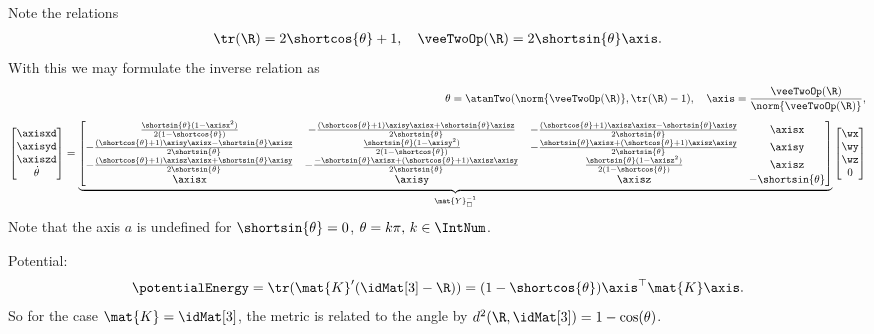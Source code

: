 Note the relations
\begin{align}
 \tr(\R) = 2\shortcos{\theta} + 1, \quad \veeTwoOp(\R) = 2 \shortsin{\theta} \axis.
\end{align}
With this we may formulate the inverse relation as
\begin{align}
 \theta = \atanTwo(\norm{\veeTwoOp(\R)}, \tr(\R)-1),
 \quad
 \axis = \frac{\veeTwoOp(\R)}{\norm{\veeTwoOp(\R)}},
\\[1ex]
 \begin{bmatrix} \axisxd \\ \axisyd \\ \axiszd \\ \dot{\theta} \end{bmatrix}
 =
 \underbrace{\begin{bmatrix}
  \tfrac{\shortsin{\theta} (1-\axisx^2)}{2(1-\shortcos{\theta})} & -\tfrac{(\shortcos{\theta}+1) \axisy \axisx + \shortsin{\theta} \axisz}{2\shortsin{\theta}} & -\tfrac{(\shortcos{\theta}+1) \axisz \axisx-\shortsin{\theta} \axisy}{2\shortsin{\theta}} & \axisx \\
  -\tfrac{(\shortcos{\theta}+1) \axisy \axisx-\shortsin{\theta} \axisz}{2\shortsin{\theta}} & \tfrac{\shortsin{\theta}(1-\axisy^2)}{2(1-\shortcos{\theta})} & -\tfrac{\shortsin{\theta} \axisx+(\shortcos{\theta}+1) \axisz \axisy}{2\shortsin{\theta}} & \axisy \\
  -\tfrac{(\shortcos{\theta}+1) \axisz \axisx+\shortsin{\theta} \axisy}{2\shortsin{\theta}} & -\tfrac{-\shortsin{\theta} \axisx+(\shortcos{\theta}+1) \axisz \axisy}{2\shortsin{\theta}} & \tfrac{\shortsin{\theta}(1-\axisz^2)}{2(1-\shortcos{\theta})} & \axisz \\
  \axisx & \axisy & \axisz & -\shortsin{\theta}
 \end{bmatrix}}_{\mat{Y}_\square^{-1}}
 \begin{bmatrix} \wx \\ \wy \\ \wz \\ 0 \end{bmatrix}
\end{align}
Note that the axis $a$ is undefined for $\shortsin{\theta} = 0$, \ie $\theta = k \pi, \, k \in \IntNum$.

Potential:
\begin{align}
 \potentialEnergy = \tr(\mat{K}'(\idMat[3]-\R)) = (1-\shortcos{\theta}) \axis^\top \mat{K} \axis.
\end{align}
So for the case $\mat{K} = \idMat[3]$, the metric is related to the angle by $d^2(\R, \idMat[3]) = 1-\cos(\theta)$.

